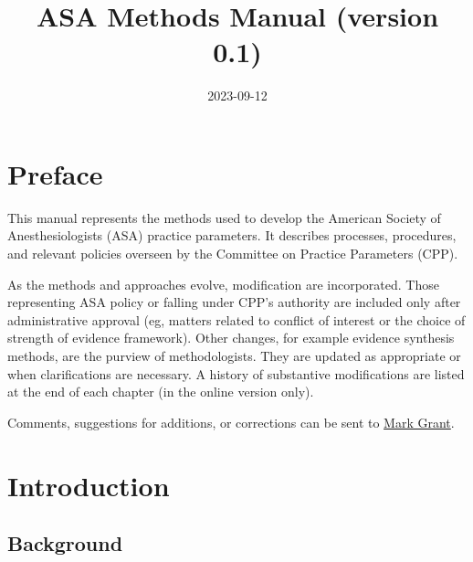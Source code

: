 \documentclass[
  letterpaper,
  DIV=11,
  numbers=noendperiod]{scrreprt}
\title{ASA Methods Manual (version 0.1)}
\author{}
\date{2023-09-12}
\renewcommand*\contentsname{Table of contents}
\newcommand\contentsname{Table of contents}
\begin{document}
\maketitle
\ifdefined\Shaded\renewenvironment{Shaded}{\begin{tcolorbox}[interior hidden, boxrule=0pt, breakable, enhanced, borderline west={3pt}{0pt}{shadecolor}, sharp corners, frame hidden]}{\end{tcolorbox}}\fi

\renewcommand*\contentsname{Table of contents}
{
\hypersetup{linkcolor=}
\setcounter{tocdepth}{2}
\tableofcontents
}

\hypertarget{preface}{%
\chapter*{Preface}\label{preface}}


This manual represents the methods used to develop the American Society
of Anesthesiologists (ASA) practice parameters. It describes processes,
procedures, and relevant policies overseen by the Committee on Practice
Parameters (CPP).

As the methods and approaches evolve, modification are incorporated.
Those representing ASA policy or falling under CPP's authority are
included only after administrative approval (eg, matters related to
conflict of interest or the choice of strength of evidence framework).
Other changes, for example evidence synthesis methods, are the purview
of methodologists. They are updated as appropriate or when
clarifications are necessary. A history of substantive modifications are
listed at the end of each chapter (in the online version only).

Comments, suggestions for additions, or corrections can be sent to
\href{mailto:m.grant@asahq.org}{Mark Grant}.


\hypertarget{introduction}{%
\chapter{Introduction}\label{introduction}}

\hypertarget{background}{%
\section{Background}\label{background}}
\end{document}
